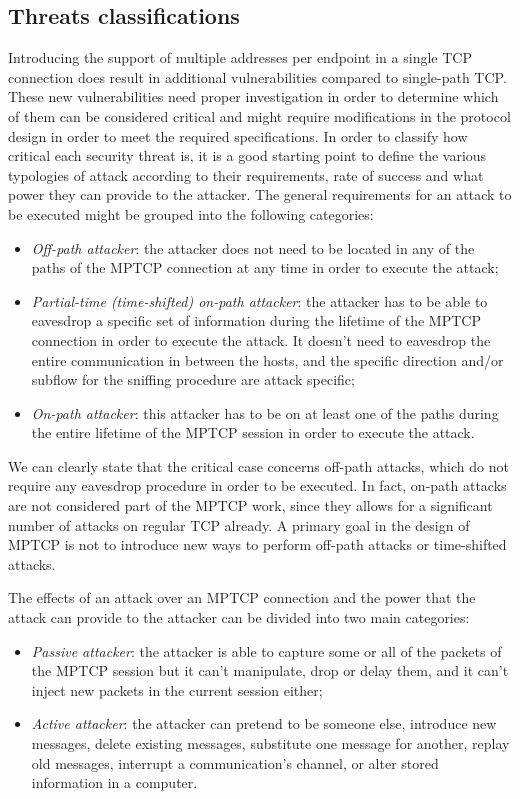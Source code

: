 \subsection{Threats classifications}
Introducing the support of multiple addresses per endpoint in a single TCP connection does result in additional vulnerabilities compared to single-path TCP. These new vulnerabilities need proper investigation in order to determine which of them can be considered critical and might require modifications in the protocol design in order to meet the required specifications. In order to classify how critical each security threat is, it is a good starting point to define the various typologies of attack according to their requirements, rate of success and what power they can provide to the attacker.
The general requirements for an attack to be executed might be grouped into the following categories:

\begin{itemize}  
\item \textit{Off-path attacker}: the attacker does not need to be located in any of the paths of the MPTCP connection at any time in order to execute the attack;
\item \textit{Partial-time (time-shifted) on-path attacker}: the attacker has to be able to eavesdrop a specific set of information during the lifetime of the MPTCP connection in order to execute the attack. It doesn't need to eavesdrop the entire communication in between the hosts, and the specific direction and/or subflow for the sniffing procedure are attack specific;
\item \textit{On-path attacker}: this attacker has to be on at least one of the paths during the entire lifetime of the MPTCP session in order to execute the attack.
\end{itemize}

We can clearly state that the critical case concerns off-path attacks, which do not require any eavesdrop procedure in order to be executed. In fact, on-path attacks are not considered part of the MPTCP work, since they allows for a significant number of attacks on regular TCP already. A primary goal in the design of MPTCP is not to introduce new ways to perform off-path attacks or time-shifted attacks.

The effects of an attack over an MPTCP connection and the power that the attack can provide to the attacker can be divided into two main categories:

\begin{itemize}  
\item \textit{Passive attacker}: the attacker is able to capture some or all of the packets of the MPTCP session but it can't manipulate, drop or delay them, and it can't inject new packets in the current session either;
\item \textit{Active attacker}: the attacker can pretend to be someone else, introduce new messages, delete existing messages, substitute one message for another, replay old messages, interrupt a communication's channel, or alter stored information in a computer.
\end{itemize}

